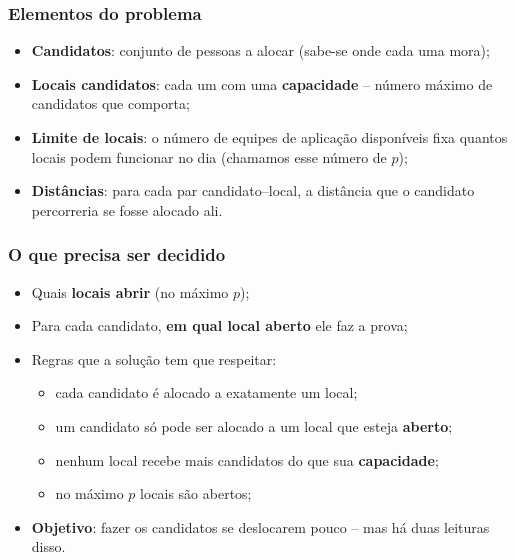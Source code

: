\documentclass[fleqn]{beamer}
\begin{document}
\begin{frame}
	\frametitle{Elementos do problema}
	\begin{itemize}
		\item \textbf{Candidatos}: conjunto de pessoas a alocar (sabe-se
			onde cada uma mora);
		\item \textbf{Locais candidatos}: cada um com uma
			\textbf{capacidade} -- número máximo de candidatos que
			comporta;
		\item \textbf{Limite de locais}: o número de equipes de aplicação
			disponíveis fixa quantos locais podem funcionar no dia
			(chamamos esse número de $p$);
		\item \textbf{Distâncias}: para cada par candidato--local, a
			distância que o candidato percorreria se fosse alocado ali.
	\end{itemize}
\end{frame}

\begin{frame}
	\frametitle{O que precisa ser decidido}
	\begin{itemize}
		\item Quais \textbf{locais abrir} (no máximo $p$);
		\item Para cada candidato, \textbf{em qual local aberto} ele faz a
			prova;
		\item Regras que a solução tem que respeitar:
		\begin{itemize}
			\item cada candidato é alocado a exatamente um local;
			\item um candidato só pode ser alocado a um local que esteja
				\textbf{aberto};
			\item nenhum local recebe mais candidatos do que sua
				\textbf{capacidade};
			\item no máximo $p$ locais são abertos;
		\end{itemize}
		\item \textbf{Objetivo}: fazer os candidatos se deslocarem pouco
			-- mas há duas leituras disso.
	\end{itemize}
\end{frame}
\end{document}
